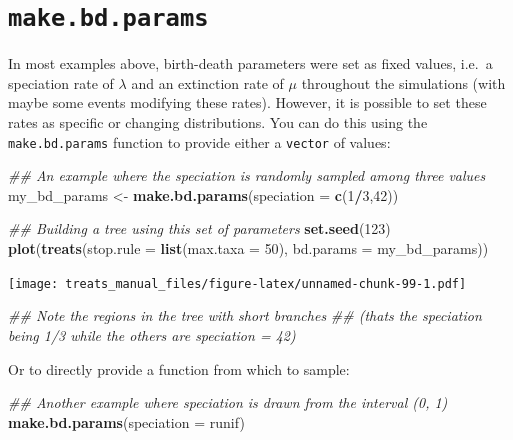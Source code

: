 \documentclass[
]{book}
\newenvironment{Shaded}{\begin{snugshade}}{\end{snugshade}}
\newcommand{\CommentTok}[1]{\textcolor[rgb]{0.56,0.35,0.01}{\textit{#1}}}
\newcommand{\DataTypeTok}[1]{\textcolor[rgb]{0.13,0.29,0.53}{#1}}
\newcommand{\DecValTok}[1]{\textcolor[rgb]{0.00,0.00,0.81}{#1}}
\newcommand{\KeywordTok}[1]{\textcolor[rgb]{0.13,0.29,0.53}{\textbf{#1}}}
\newcommand{\NormalTok}[1]{#1}
\newcommand{\OperatorTok}[1]{\textcolor[rgb]{0.81,0.36,0.00}{\textbf{#1}}}
\newcommand{\StringTok}[1]{\textcolor[rgb]{0.31,0.60,0.02}{#1}}
\begin{document}
\hypertarget{makebdparams}{%
\section{\texorpdfstring{\texttt{make.bd.params}}{make.bd.params}}\label{makebdparams}}

In most examples above, birth-death parameters were set as fixed values, i.e.~a speciation rate of \(\lambda\) and an extinction rate of \(\mu\) throughout the simulations (with maybe some events modifying these rates).
However, it is possible to set these rates as specific or changing distributions.
You can do this using the \texttt{make.bd.params} function to provide either a \texttt{vector} of values:

\begin{Shaded}
\begin{Highlighting}[]
\CommentTok{\#\# An example where the speciation is randomly sampled among three values}
\NormalTok{my\_bd\_params \textless{}{-}}\StringTok{ }\KeywordTok{make.bd.params}\NormalTok{(}\DataTypeTok{speciation =} \KeywordTok{c}\NormalTok{(}\DecValTok{1}\OperatorTok{/}\DecValTok{3}\NormalTok{,}\DecValTok{42}\NormalTok{))}

\CommentTok{\#\# Building a tree using this set of parameters}
\KeywordTok{set.seed}\NormalTok{(}\DecValTok{123}\NormalTok{)}
\KeywordTok{plot}\NormalTok{(}\KeywordTok{treats}\NormalTok{(}\DataTypeTok{stop.rule =} \KeywordTok{list}\NormalTok{(}\DataTypeTok{max.taxa =} \DecValTok{50}\NormalTok{), }\DataTypeTok{bd.params =}\NormalTok{ my\_bd\_params))}
\end{Highlighting}
\end{Shaded}

\texttt{[image: treats\_manual\_files/figure-latex/unnamed-chunk-99-1.pdf]}

\begin{Shaded}
\begin{Highlighting}[]
\CommentTok{\#\# Note the regions in the tree with short branches}
\CommentTok{\#\# (that\textquotesingle{}s the speciation being 1/3 while the others are speciation = 42) }
\end{Highlighting}
\end{Shaded}

Or to directly provide a function from which to sample:

\begin{Shaded}
\begin{Highlighting}[]
\CommentTok{\#\# Another example where speciation is drawn from the interval (0, 1)}
\KeywordTok{make.bd.params}\NormalTok{(}\DataTypeTok{speciation =}\NormalTok{ runif)}
\end{Highlighting}
\end{Shaded}
\end{document}

